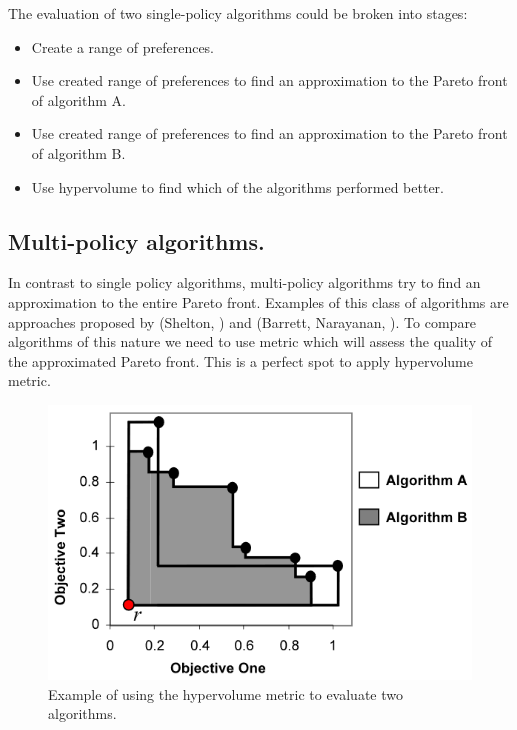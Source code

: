 The evaluation of two single-policy algorithms could be broken into stages:

\begin{itemize}

\item Create a range of preferences.

\item Use created range of preferences to find an approximation to the Pareto front of algorithm A.

\item Use created range of preferences to find an approximation to the Pareto front of algorithm B.

\item Use hypervolume to find which of the algorithms performed better.

\end{itemize}

\subsection{Multi-policy algorithms.}

In contrast to single policy algorithms, multi-policy algorithms try to find an approximation to the entire Pareto front. Examples of this class of algorithms are approaches proposed by (Shelton, \cite{Shelton2001}) and (Barrett, Narayanan, \cite{BarrettN2008}). To compare algorithms of this nature we need to use metric which will assess the quality of the approximated Pareto front. This is a perfect spot to apply hypervolume metric. \\

\begin{figure}[ht]
\vskip 0.2in
\centering
\includegraphics[scale=0.9]{2alghypervolume.png}
\caption{Example of using the hypervolume metric to evaluate two algorithms.}
\vskip -0.2in
\label{ParetoDominance}
\end{figure}

